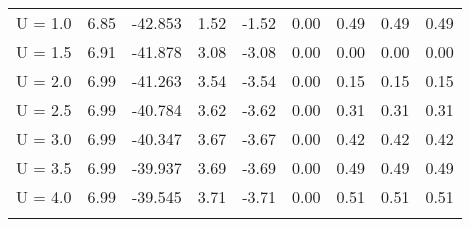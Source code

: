 \begin{table}[H]
\begin{tabular}{cccccc|ccc}
		U = 1.0 & 6.85 & -42.853 & 1.52 & -1.52 & 0.00 & 0.49 & 0.49 & 0.49 \\
		U = 1.5 & 6.91 & -41.878 & 3.08 & -3.08 & 0.00 & 0.00 & 0.00 & 0.00 \\
		U = 2.0 & 6.99 & -41.263 & 3.54 & -3.54 & 0.00 & 0.15 & 0.15 & 0.15 \\
		U = 2.5 & 6.99 & -40.784 & 3.62 & -3.62 & 0.00 & 0.31 & 0.31 & 0.31 \\
		U = 3.0 & 6.99 & -40.347 & 3.67 & -3.67 & 0.00 & 0.42 & 0.42 & 0.42 \\
		U = 3.5 & 6.99 & -39.937 & 3.69 & -3.69 & 0.00 & 0.49 & 0.49 & 0.49 \\
		U = 4.0 & 6.99 & -39.545 & 3.71 & -3.71 & 0.00 & 0.51 & 0.51 & 0.51 \\
		\bottomrule
		\bottomrule
		\label{tab:4.11}
	\end{tabular}
\end{table}

